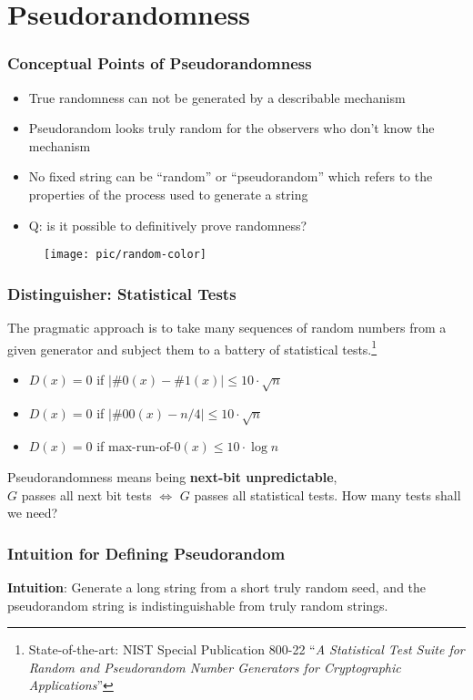 \section{Pseudorandomness}
\begin{frame}\frametitle{Conceptual Points of Pseudorandomness}
\begin{itemize}
\item True randomness can not be generated by a describable mechanism
\item Pseudorandom looks truly random for the observers who don't know the mechanism 
\item No fixed string can be ``random'' or ``pseudorandom'' which refers to the properties of the process used to generate a string
\item \alert{Q: is it possible to definitively prove randomness?}
\end{itemize}
\begin{figure}
\begin{center}
\texttt{[image: pic/random-color]} 
\end{center}
\end{figure}
\end{frame}
\begin{frame}\frametitle{Distinguisher: Statistical Tests}
The pragmatic approach is to take many sequences of random numbers from a given generator and subject them to a battery of statistical tests.\footnote{State-of-the-art: NIST Special Publication 800-22 ``\emph{A Statistical Test Suite for Random and Pseudorandom Number Generators for Cryptographic Applications}''}
\begin{exampleblock}{}
\begin{itemize}
\item $D(x)=0$ if $\left| \#0(x) - \#1(x)\right| \le 10\cdot \sqrt{n}$
\item $D(x)=0$ if $\left| \#00(x) - n/4\right| \le 10\cdot \sqrt{n}$
\item $D(x)=0$ if $\text{max-run-of-}0(x) \le 10\cdot \log{n}$
\end{itemize}
\end{exampleblock}
Pseudorandomness means being \textbf{next-bit unpredictable},\\
$G$ passes all next bit tests $\iff$ $G$ passes all statistical tests.
How many tests shall we need?
\end{frame}
\begin{frame}\frametitle{Intuition for Defining Pseudorandom}
\textbf{Intuition}: Generate a long string from a short truly random seed, and the pseudorandom string is indistinguishable from truly random strings.
\begin{figure}
\begin{center}

\end{center}
\end{figure}
\end{frame}
